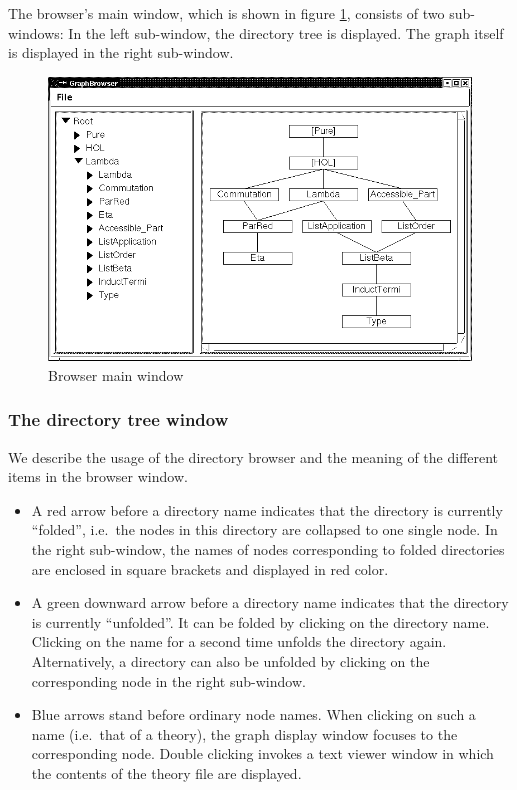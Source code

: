 The browser's main window, which is shown in figure
\ref{fig:browserwindow}, consists of two sub-windows: In the left
sub-window, the directory tree is displayed. The graph itself is
displayed in the right sub-window.
\begin{figure}[ht]
  \includegraphics[width=\textwidth]{browser_screenshot}
  \caption{\label{fig:browserwindow} Browser main window}
\end{figure}


\subsubsection*{The directory tree window}

We describe the usage of the directory browser and the meaning of the
different items in the browser window.
\begin{itemize}
  
\item A red arrow before a directory name indicates that the directory
  is currently ``folded'', i.e.~the nodes in this directory are
  collapsed to one single node. In the right sub-window, the names of
  nodes corresponding to folded directories are enclosed in square
  brackets and displayed in red color.
  
\item A green downward arrow before a directory name indicates that
  the directory is currently ``unfolded''. It can be folded by
  clicking on the directory name.  Clicking on the name for a second
  time unfolds the directory again.  Alternatively, a directory can
  also be unfolded by clicking on the corresponding node in the right
  sub-window.
  
\item Blue arrows stand before ordinary node names. When clicking on such a
  name (i.e.\ that of a theory), the graph display window focuses to the
  corresponding node. Double clicking invokes a text viewer window in which
  the contents of the theory file are displayed.

\end{itemize}


